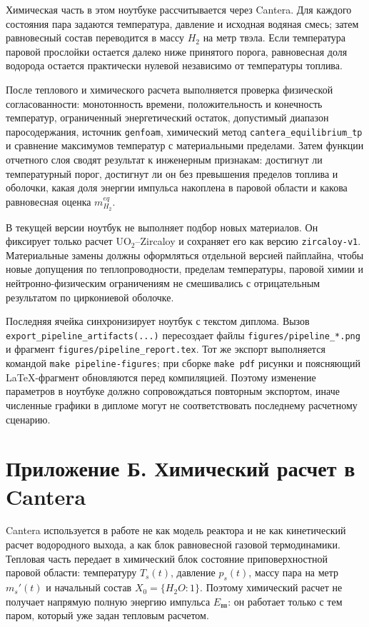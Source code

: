 \documentclass[12pt]{article}
\begin{document}
Химическая часть в этом ноутбуке рассчитывается через Cantera. Для каждого состояния пара задаются температура, давление и исходная водяная смесь; затем равновесный состав переводится в массу \(H_2\) на метр твэла. Если температура паровой прослойки остается далеко ниже принятого порога, равновесная доля водорода остается практически нулевой независимо от температуры топлива.

После теплового и химического расчета выполняется проверка физической согласованности: монотонность времени, положительность и конечность температур, ограниченный энергетический остаток, допустимый диапазон паросодержания, источник \texttt{genfoam}, химический метод \texttt{cantera\_equilibrium\_tp} и сравнение максимумов температур с материальными пределами. Затем функции отчетного слоя сводят результат к инженерным признакам: достигнут ли температурный порог, достигнут ли он без превышения пределов топлива и оболочки, какая доля энергии импульса накоплена в паровой области и какова равновесная оценка \(m_{H_2}^{eq}\).

В текущей версии ноутбук не выполняет подбор новых материалов. Он фиксирует только расчет \(\mathrm{UO_2}\)--Zircaloy и сохраняет его как версию \texttt{zircaloy-v1}. Материальные замены должны оформляться отдельной версией пайплайна, чтобы новые допущения по теплопроводности, пределам температуры, паровой химии и нейтронно-физическим ограничениям не смешивались с отрицательным результатом по циркониевой оболочке.

Последняя ячейка синхронизирует ноутбук с текстом диплома. Вызов \texttt{export\_pipeline\_artifacts(...)} пересоздает файлы \texttt{figures/pipeline\_*.png} и фрагмент \texttt{figures/pipeline\_report.tex}. Тот же экспорт выполняется командой \texttt{make pipeline-figures}; при сборке \texttt{make pdf} рисунки и поясняющий LaTeX-фрагмент обновляются перед компиляцией. Поэтому изменение параметров в ноутбуке должно сопровождаться повторным экспортом, иначе численные графики в дипломе могут не соответствовать последнему расчетному сценарию.

\newpage
\section*{Приложение Б. Химический расчет в Cantera}

Cantera используется в работе не как модель реактора и не как кинетический расчет водородного выхода, а как блок равновесной газовой термодинамики. Тепловая часть передает в химический блок состояние приповерхностной паровой области: температуру \(T_s(t)\), давление \(p_s(t)\), массу пара на метр \(m_s'(t)\) и начальный состав \(X_0=\{H_2O:1\}\). Поэтому химический расчет не получает напрямую полную энергию импульса \(E_{\mathrm{вв}}\): он работает только с тем паром, который уже задан тепловым расчетом.
\end{document}
